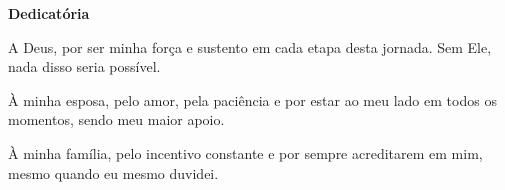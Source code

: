 \def\textoDedicatoria{
  A Deus, por ser minha força e sustento em cada etapa desta jornada.
  Sem Ele, nada disso seria possível.

  À minha esposa, pelo amor, pela paciência e por estar ao meu lado
  em todos os momentos, sendo meu maior apoio.

  À minha família, pelo incentivo constante e por sempre acreditarem
  em mim, mesmo quando eu mesmo duvidei.
}

\begin{dedicatoria}
  \textbf{Dedicatória}
  \vfill
  \hfill{}
  \parbox{6cm}{
    \begin{flushright}
      \textoDedicatoria \
    \end{flushright}
      }
\end{dedicatoria}